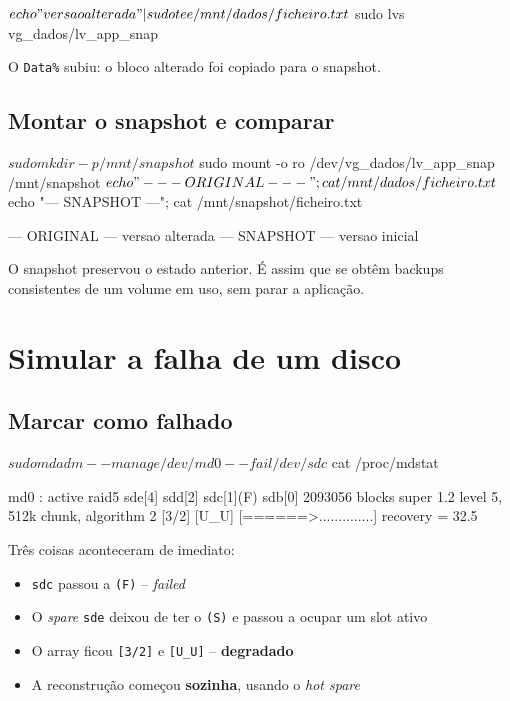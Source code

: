 \documentclass[11pt,a4paper]{article}
\begin{document}
\begin{terminal}
$ echo "versao alterada" | sudo tee /mnt/dados/ficheiro.txt
$ sudo lvs vg_dados/lv_app_snap
\end{terminal}

O \texttt{Data\%} subiu: o bloco alterado foi copiado para o snapshot.

\subsection{Montar o snapshot e comparar}

\begin{terminal}
$ sudo mkdir -p /mnt/snapshot
$ sudo mount -o ro /dev/vg_dados/lv_app_snap /mnt/snapshot
$ echo "--- ORIGINAL ---"; cat /mnt/dados/ficheiro.txt
$ echo "--- SNAPSHOT ---"; cat /mnt/snapshot/ficheiro.txt
\end{terminal}

\begin{saida}
--- ORIGINAL ---
versao alterada
--- SNAPSHOT ---
versao inicial
\end{saida}

\begin{verificar}
O snapshot preservou o estado anterior. É assim que se obtêm backups consistentes de um volume em uso, sem parar a aplicação.
\end{verificar}

\section{Simular a falha de um disco}

\subsection{Marcar como falhado}

\begin{terminal}
$ sudo mdadm --manage /dev/md0 --fail /dev/sdc
$ cat /proc/mdstat
\end{terminal}

\begin{saida}
md0 : active raid5 sde[4] sdd[2] sdc[1](F) sdb[0]
      2093056 blocks super 1.2 level 5, 512k chunk, algorithm 2 [3/2] [U_U]
      [======>..............]  recovery = 32.5%
\end{saida}

\begin{verificar}
Três coisas aconteceram de imediato:
\begin{itemize}
  \item \texttt{sdc} passou a \texttt{(F)} -- \emph{failed}
  \item O \emph{spare} \texttt{sde} deixou de ter o \texttt{(S)} e passou a ocupar um slot ativo
  \item O array ficou \texttt{[3/2]} e \texttt{[U\_U]} -- \textbf{degradado}
  \item A reconstrução começou \textbf{sozinha}, usando o \emph{hot spare}
\end{itemize}
\end{verificar}
\end{document}
